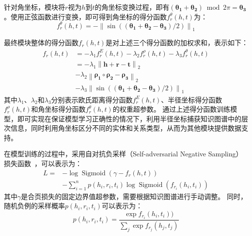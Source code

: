\documentclass[algorithmlist, AutoFakeBold, AutoFakeSlant, figurelist, tablelist, nomlist, engineering]{seuthesix}
\begin{document}
针对角坐标，模块将$r$视为$h$到$t$的角坐标变换过程，即有$(\bm{\theta_1} + \bm{\theta_2}) \bmod 2 \pi = \bm{\theta_3}$。使用正弦函数进行变换，即可得到角坐标的得分函数$f^{\theta}_r(h, t)$为：
\begin{equation}
  f^{\theta}_r\left(h, t\right) =-\left\|\sin \left(\left(\bm{\theta_1}+\bm{\theta_2}-\bm{\theta_3}\right) / 2\right)\right\|_1
\end{equation}

最终模块整体的得分函数$f_r(h, t)$是对上述三个得分函数的加权求和，表示如下：
\begin{equation}
  \begin{aligned}
    f_r\left(h, t\right) &= -\lambda_1 f^{E}_r(h, t) -\lambda_2 f^{\rho}_r(h, t) -\lambda_3 f^{\theta}_r(h, t) \\
    &= -\lambda_1 \left\|\bm{h} + \bm{r} - \bm{t}\right\|_2 \\
    &-\lambda_2 \left\|\bm{\rho_1} \circ \bm{\rho_2} - \bm{\rho_3}\right\|_2 \\
    &-\lambda_3\left\|\sin \left(\left(\bm{\theta_1}+\bm{\theta_2}-\bm{\theta_3}\right) / 2\right)\right\|_1
  \end{aligned}
  \label{f_1}
\end{equation}
其中$\lambda_1$、$\lambda_2$和$\lambda_3$分别表示欧氏距离得分函数$f^E_r(h, t)$、半径坐标得分函数$f^{\rho}_r(h, t)$和角坐标得分函数$f^{\theta}_r(h, t)$的权重超参数。
通过上述得分函数训练模型，即可实现在保证模型学习正确性的情况下，利用半径坐标捕获知识图谱中的层次信息，同时利用角坐标区分不同的实体和关系类型，从而为其他模块提供数据支持。

在模型训练的过程中，采用自对抗负采样（Self-adversarial Negative Sampling）损失函数~\cite{sun2018rotate}，可以表示为：
\begin{equation}
  \begin{aligned}
  L= & -\log \operatorname{Sigmoid}\left(\gamma-f_r(h, t)\right) \\
  & -\sum_{i=1}^n p\left(h_i, r_i, t_i\right) \log \operatorname{Sigmoid}(f_{r_i}(h_i, t_i))
  \end{aligned}
  \label{loss_1}
\end{equation}
其中$\gamma$是合页损失的固定边界值超参数，需要根据知识图谱进行手动调整。
同时，随机负例的采样概率$p(h_i, r_i, t_i)$可以表示为：
\begin{equation}
  p(h_i, r_i, t_i)=\frac{\exp f_{r_i}(h_i, t_i))}{\sum_j \exp f_{r_j}(h_j, t_j)}
  \label{abc}
\end{equation}
\end{document}
